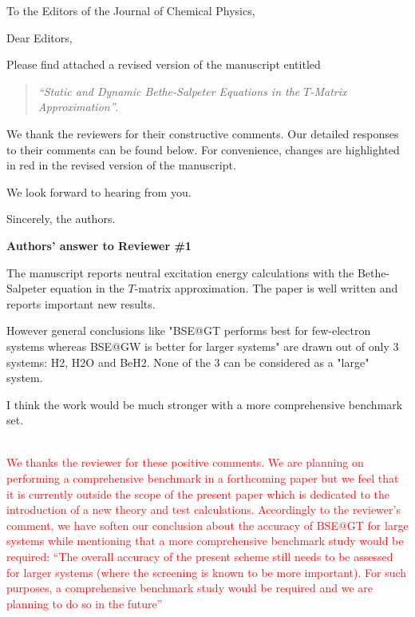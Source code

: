 \documentclass[10pt]{letter}
\newcommand{\alert}[1]{\textcolor{red}{#1}}
\begin{document}
\begin{letter}%
{To the Editors of the Journal of Chemical Physics,}

\opening{Dear Editors,}

\justifying
Please find attached a revised version of the manuscript entitled 
\begin{quote}
	\textit{``Static and Dynamic Bethe-Salpeter Equations in the $T$-Matrix Approximation''}.
\end{quote}
We thank the reviewers for their constructive comments.
Our detailed responses to their comments can be found below.
For convenience, changes are highlighted in red in the revised version of the manuscript. 

We look forward to hearing from you.

\closing{Sincerely, the authors.}

\newpage

\noindent \textbf{\large Authors' answer to Reviewer \#1}
 
{The manuscript reports neutral excitation energy calculations with the Bethe-Salpeter equation in the $T$-matrix approximation. 
The paper is well written and reports important new results. 

However general conclusions like "BSE@GT performs best for few-electron systems whereas BSE@GW is better for larger systems" 
are drawn out of only 3 systems: H2, H2O and BeH2. None of the 3 can be considered as a "large" system. 

I think the work would be much stronger with a more comprehensive benchmark set.}
\\
\alert{
We thanks the reviewer for these positive comments.
We are planning on performing a comprehensive benchmark in a forthcoming paper but we feel that it is currently outside the scope of the present paper which is dedicated to the introduction of a new theory and test calculations.
Accordingly to the reviewer's comment, we have soften our conclusion about the accuracy of BSE@GT for large systems while mentioning that a more comprehensive benchmark study would be required:
``The overall accuracy of the present scheme still needs to be assessed for larger systems (where the screening is known to be more important). 
For such purposes, a comprehensive benchmark study would be required and we are planning to do so in the future''
}

\begin{enumerate}


\end{enumerate}
\end{letter}
\end{document}
